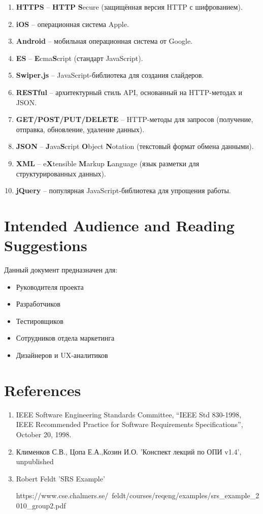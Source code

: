 \documentclass{scrreprt}
\begin{document}
\begin{enumerate}
\item\textbf{HTTPS} – \textbf{HTTP} \textbf{S}ecure (защищённая версия HTTP с шифрованием).

\item\textbf{iOS} – операционная система Apple.

\item\textbf{Android} – мобильная операционная система от Google.

\item\textbf{ES} – \textbf{E}cma\textbf{S}cript (стандарт JavaScript).

\item\textbf{Swiper.js} – JavaScript-библиотека для создания слайдеров.

\item\textbf{RESTful} – архитектурный стиль API, основанный на HTTP-методах и JSON.

\item\textbf{GET/POST/PUT/DELETE} – HTTP-методы для запросов (получение, отправка, обновление, удаление данных).

\item\textbf{JSON} – \textbf{J}ava\textbf{S}cript \textbf{O}bject \textbf{N}otation (текстовый формат обмена данными).

\item\textbf{XML} – e\textbf{X}tensible \textbf{M}arkup \textbf{L}anguage (язык разметки для структурированных данных).

\item\textbf{jQuery} – популярная JavaScript-библиотека для упрощения работы.
\end{enumerate}
\section{Intended Audience and Reading Suggestions}
Данный документ предназначен для:
\begin{itemize}
	\item Руководителя проекта
	\item Разработчиков
	\item Тестировщиков
	\item Сотрудников отдела маркетинга
	\item Дизайнеров и UX-аналитиков
\end{itemize}

\section{References}
\begin{enumerate}
	\item IEEE Software Engineering Standards Committee, “IEEE Std 830-1998, IEEE Recommended
	Practice for Software Requirements Specifications”, October 20, 1998.
	\item Клименков С.В., Цопа Е.А.,Козин И.О. 'Конспект лекций по ОПИ v1.4', unpublished
	\item Robert Feldt
	'SRS Example'
	
	 https://www.cse.chalmers.se/~feldt/courses/reqeng/examples/srs_example_2010_group2.pdf
\end{enumerate}
\end{document}
